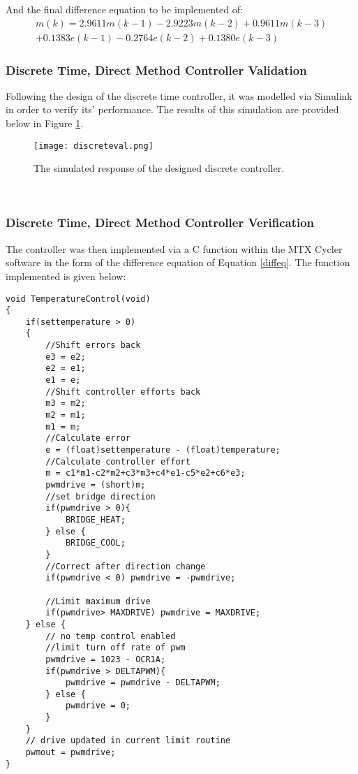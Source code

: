 And the final difference equation to be implemented of:
\begin{equation}
\begin{split}
\label{diffeq}
	m(k) =  2.9611m(k-1) - 2.9223m(k-2) + 0.9611m(k-3)\\ + 0.1383e(k-1) - 0.2764e(k-2) + 0.1380e(k-3)
\end{split}
\end{equation}

\subsubsection{Discrete Time, Direct Method Controller Validation}

Following the design of the discrete time controller, it was modelled via Simulink in order to verify its' performance. The results of this simulation are provided below in Figure \ref{fig:discreteval}.

\begin{figure}[!htb]
	\centering
	\texttt{[image: discreteval.png]}
	\caption[Discrete Controller Simulation.]{The simulated response of the designed discrete controller.}
	\label{fig:discreteval}
\end{figure} 
\FloatBarrier

\subsubsection{Discrete Time, Direct Method Controller Verification}

The controller was then implemented via a C function within the MTX Cycler software in the form of the difference equation of Equation \ref{diffeq}. The function implemented is given below:

\begin{lstlisting}
void TemperatureControl(void)
{
	if(settemperature > 0)
	{
		//Shift errors back
		e3 = e2;
		e2 = e1;
		e1 = e;
		//Shift controller efforts back
		m3 = m2;
		m2 = m1;
		m1 = m;
		//Calculate error
		e = (float)settemperature - (float)temperature;
		//Calculate controller effort
		m = c1*m1-c2*m2+c3*m3+c4*e1-c5*e2+c6*e3;
		pwmdrive = (short)m;
		//set bridge direction
		if(pwmdrive > 0){
			BRIDGE_HEAT;
		} else {
			BRIDGE_COOL;
		}
		//Correct after direction change
		if(pwmdrive < 0) pwmdrive = -pwmdrive;
		
		//Limit maximum drive
		if(pwmdrive> MAXDRIVE) pwmdrive = MAXDRIVE;
	} else {
		// no temp control enabled	
		//limit turn off rate of pwm	  
		pwmdrive = 1023 - OCR1A;
		if(pwmdrive > DELTAPWM){
			pwmdrive = pwmdrive - DELTAPWM;
		} else {
			pwmdrive = 0;	
		}
	}
	// drive updated in current limit routine
	pwmout = pwmdrive;	
}
\end{lstlisting}

